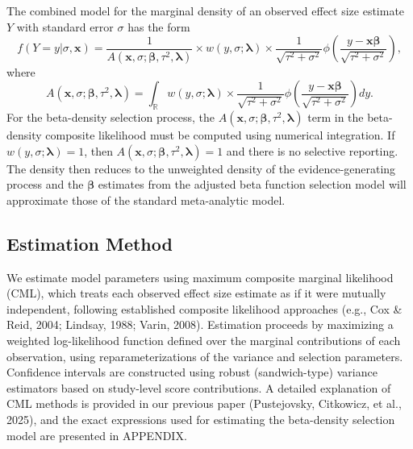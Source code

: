 \documentclass[
  man, donotrepeattitle,floatsintext]{apa7}
\begin{document}
The combined model for the marginal density of an observed effect size estimate \(Y\) with standard error \(\sigma\) has the form
\begin{equation}
\label{eq:generic-selection}
f(Y = y | \sigma, \mathbf{x}) = \frac{1}{A(\mathbf{x}, \sigma; \boldsymbol\beta, \tau^2, \boldsymbol\lambda)} \times w\left(y, \sigma; \boldsymbol\lambda \right) \times \frac{1}{\sqrt{\tau^2 + \sigma^2}} \phi\left(\frac{y - \mathbf{x} \boldsymbol\beta}{\sqrt{\tau^2 + \sigma^2}}\right),
\end{equation}
where
\begin{equation}
\label{eq:generic-selection-A}
A(\mathbf{x}, \sigma; \boldsymbol\beta, \tau^2, \boldsymbol\lambda) =  \int_\mathbb{R} w\left(y, \sigma; \boldsymbol\lambda \right) \times  \frac{1}{\sqrt{\tau^2 + \sigma^2}}\phi\left(\frac{y - \mathbf{x}\boldsymbol\beta}{\sqrt{\tau^2 + \sigma^2}}\right) dy.
\end{equation}
For the beta-density selection process, the \(A(\mathbf{x}, \sigma; \boldsymbol\beta, \tau^2, \boldsymbol\lambda)\) term in the beta-density composite likelihood must be computed using numerical integration.
If \(w(y, \sigma; \boldsymbol\lambda) = 1\), then \(A(\mathbf{x}, \sigma; \boldsymbol\beta, \tau^2, \boldsymbol\lambda) = 1\) and there is no selective reporting. The density then reduces to the unweighted density of the evidence-generating process and the \(\boldsymbol\beta\) estimates from the adjusted beta function selection model will approximate those of the standard meta-analytic model.

\subsection{Estimation Method}\label{estimation-method}

We estimate model parameters using maximum composite marginal likelihood (CML), which treats each observed effect size estimate as if it were mutually independent, following established composite likelihood approaches (e.g., Cox \& Reid, 2004; Lindsay, 1988; Varin, 2008). Estimation proceeds by maximizing a weighted log-likelihood function defined over the marginal contributions of each observation, using reparameterizations of the variance and selection parameters. Confidence intervals are constructed using robust (sandwich-type) variance estimators based on study-level score contributions. A detailed explanation of CML methods is provided in our previous paper (Pustejovsky, Citkowicz, et al., 2025), and the exact expressions used for estimating the beta-density selection model are presented in APPENDIX.
\end{document}
